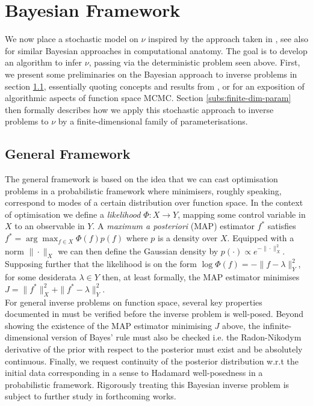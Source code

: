 \documentclass[runningheads]{llncs}
\begin{document}
\section{Bayesian Framework}\label{sec:bayesian}

We now place a stochastic model on $\nu$ inspired by the approach taken in
\cite{cotter2013bayesian}, see also
\cite{schiratti2017bayesian,allassonniere2007towards,allassonniere2008map} for
similar Bayesian approaches in computational anatomy. The goal is to develop an
algorithm to infer $\nu$, passing via the deterministic problem seen above.
First, we present some preliminaries on the Bayesian approach to inverse
problems in section \ref{subs:gf}, essentially quoting concepts and results from
\cite{dashti2017bayesian}, or \cite{cotter2013mcmc} for an exposition of
algorithmic aspects of function space MCMC. Section \ref{subs:finite-dim-param}
then formally describes how we apply this stochastic approach to inverse
problems to $\nu$ by a finite-dimensional family of parameterisations.

\subsection{General Framework}\label{subs:gf}

The general framework is based on the idea that we can cast optimisation
problems in a probabilistic framework where minimisers, roughly speaking,
correspond to modes of a certain distribution over function space.  In the
context of optimisation we define a \emph{likelihood} $\Phi : X\rightarrow Y$,
mapping some control variable in $X$ to an observable in $Y$.  A \emph{maximum a
posteriori} (MAP) estimator $f^*$ satisfies $f^* = \arg\max_{f\in X} \Phi(f)
p(f)$ where $p$ is a density over $X$. Equipped with a norm $\|\cdot\|_X$ we can
then define the Gaussian density by $p(\cdot) \propto e^{-\|\cdot\|_X^2}$.
Supposing further that the likelihood is on the form $\log \Phi(f) =
-\|f-\lambda\|_Y^2$, for some desiderata $\lambda\in Y$ then, at least formally,
the MAP estimator minimises $J=\|f^*\|_X^2 + \|f^*-\lambda\|_Y^2$.\\

For general inverse problems on function space, several key properties
documented in \cite{dashti2017bayesian} must be verified before the
inverse problem is well-posed. Beyond showing the existence of the MAP estimator
minimising $J$ above, the infinite-dimensional version of Bayes' rule must also
be checked i.e. the Radon-Nikodym derivative of the prior with respect to the
posterior must exist and be absolutely continuous. Finally, we request
continuity of the posterior distribution w.r.t the initial data corresponding in
a sense to Hadamard well-posedness in a probabilistic framework. Rigorously
treating this Bayesian inverse problem is subject to further study in 
forthcoming works.
\end{document}
